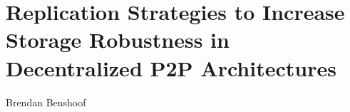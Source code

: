 \chapter{Replication Strategies to Increase Storage Robustness in Decentralized P2P Architectures}
%
%
%
\begin{center}
Brendan Benshoof
\end{center}


%
%



%







